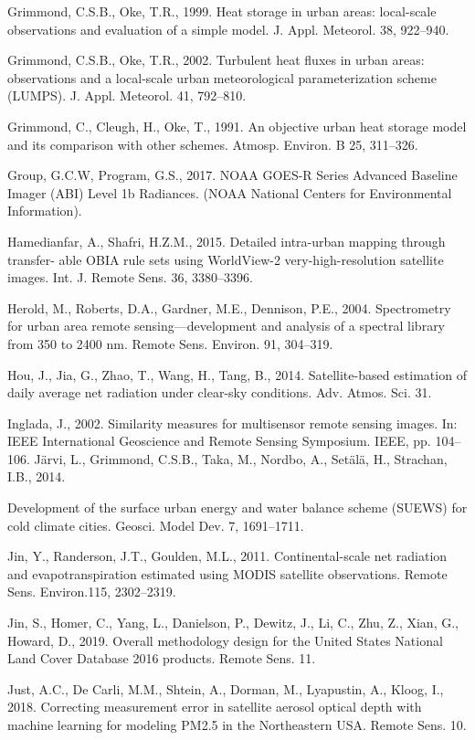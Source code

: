 \documentclass[3p,times]{elsarticle}
\begin{document}
Grimmond, C.S.B., Oke, T.R., 1999. Heat storage in urban areas: local-scale observations and evaluation of a simple model. J. Appl. Meteorol. 38, 922–940.

Grimmond, C.S.B., Oke, T.R., 2002. Turbulent heat fluxes in urban areas: observations and a local-scale urban meteorological parameterization scheme (LUMPS). J. Appl. Meteorol. 41, 792–810.

Grimmond, C., Cleugh, H., Oke, T., 1991. An objective urban heat storage model and its comparison with other schemes. Atmosp. Environ. B 25, 311–326.

Group, G.C.W, Program, G.S., 2017. NOAA GOES-R Series Advanced Baseline Imager (ABI) Level 1b Radiances. (NOAA National Centers for Environmental Information).

Hamedianfar, A., Shafri, H.Z.M., 2015. Detailed intra-urban mapping through transfer- able OBIA rule sets using WorldView-2 very-high-resolution satellite images. Int. J. Remote Sens. 36, 3380–3396.

Herold, M., Roberts, D.A., Gardner, M.E., Dennison, P.E., 2004. Spectrometry for urban area remote sensing—development and analysis of a spectral library from 350 to 2400 nm. Remote Sens. Environ. 91, 304–319.

Hou, J., Jia, G., Zhao, T., Wang, H., Tang, B., 2014. Satellite-based estimation of daily average net radiation under clear-sky conditions. Adv. Atmos. Sci. 31.

Inglada, J., 2002. Similarity measures for multisensor remote sensing images. In: IEEE International Geoscience and Remote Sensing Symposium. IEEE, pp. 104–106. Järvi, L., Grimmond, C.S.B., Taka, M., Nordbo, A., Setälä, H., Strachan, I.B., 2014.

Development of the surface urban energy and water balance scheme (SUEWS) for cold climate cities. Geosci. Model Dev. 7, 1691–1711.

Jin, Y., Randerson, J.T., Goulden, M.L., 2011. Continental-scale net radiation and evapotranspiration estimated using MODIS satellite observations. Remote Sens. Environ.115, 2302–2319.

Jin, S., Homer, C., Yang, L., Danielson, P., Dewitz, J., Li, C., Zhu, Z., Xian, G., Howard, D., 2019. Overall methodology design for the United States National Land Cover Database 2016 products. Remote Sens. 11.

Just, A.C., De Carli, M.M., Shtein, A., Dorman, M., Lyapustin, A., Kloog, I., 2018. Correcting measurement error in satellite aerosol optical depth with machine learning for modeling PM2.5 in the Northeastern USA. Remote Sens. 10.
\end{document}
